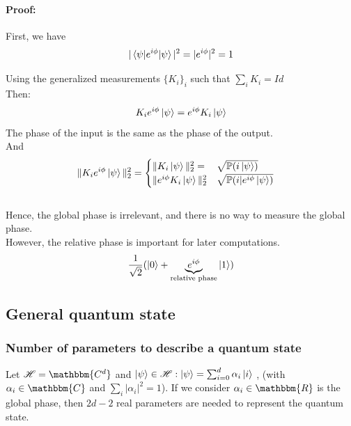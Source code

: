 \documentclass{article}
\begin{document}
\paragraph{Proof: }
First, we have
\begin{equation}
    |\braket{\psi|e^{i\phi}|\psi}|^2 = |e^{i\phi}|^2 = 1
\end{equation}

Using the generalized measurements $\{K_i\}_i$ such that $\sum_i K_i = Id$
\\\noindent
Then:
\begin{equation}
    K_ie^{i\phi}\ket{\psi} = e^{i\phi}K_i\ket{\psi}
\end{equation}
\noindent
The phase of the input is the same as the phase of the output.
\\\noindent
And
\begin{equation}
    \begin{aligned}
        \|K_ie^{i\phi}\ket{\psi}\|^2_2
            & =\begin{cases}
               \| K_i \ket{\psi} \|_2^2 = & \sqrt{ \mathbb{P}(i\ket{\psi})} \\
               \|e^{i\phi} K_i\ket{\psi}\|_2^2 & \sqrt{\mathbb{P}(i|e^{i\phi}\ket{\psi})}
            \end{cases}
    \end{aligned}
\end{equation}
\\\noindent
Hence, the global phase is irrelevant, and there is no way to measure the global phase.
\\\noindent
However, the relative phase is important for later computations.
\begin{equation}
    \frac{1}{\sqrt{2}}(\ket{0}+\underbrace{e^{i\phi}}_{\text{relative phase}}\ket{1})
\end{equation}

\subsection{General quantum state}
\subsubsection*{Number of parameters to describe a quantum state}
Let $\mathscr{H} = \mathbbm{C^d}$ and $\ket{\psi} \in \mathscr{H}: \ket{\psi}
= \sum_{i=0}^d \alpha_i \ket{i}$
, (with $\alpha_i \in \mathbbm{C}$ and $\sum_i |\alpha_i|^2=1$).
If we consider $\alpha_i \in \mathbbm{R}$
is the global phase, then $2d-2$ real parameters are needed to represent the quantum state.
\end{document}
